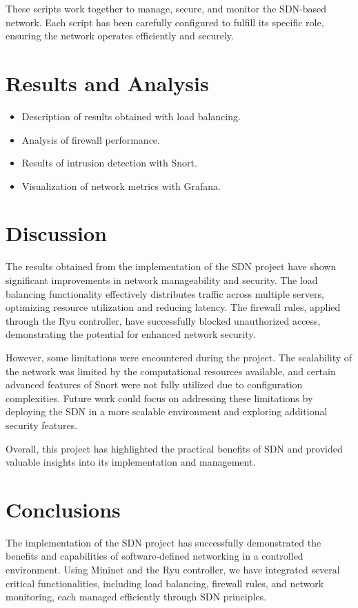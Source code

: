 \documentclass[a4paper,12pt]{article}
\begin{document}
These scripts work together to manage, secure, and monitor the SDN-based network. Each script has been carefully configured to fulfill its specific role, ensuring the network operates efficiently and securely.


\section{Results and Analysis}
\begin{itemize}
    \item Description of results obtained with load balancing.
    \item Analysis of firewall performance.
    \item Results of intrusion detection with Snort.
    \item Visualization of network metrics with Grafana.
\end{itemize}

\section{Discussion}
The results obtained from the implementation of the SDN project have shown significant improvements in network manageability and security. The load balancing functionality effectively distributes traffic across multiple servers, optimizing resource utilization and reducing latency. The firewall rules, applied through the Ryu controller, have successfully blocked unauthorized access, demonstrating the potential for enhanced network security.

However, some limitations were encountered during the project. The scalability of the network was limited by the computational resources available, and certain advanced features of Snort were not fully utilized due to configuration complexities. Future work could focus on addressing these limitations by deploying the SDN in a more scalable environment and exploring additional security features.

Overall, this project has highlighted the practical benefits of SDN and provided valuable insights into its implementation and management.

\section{Conclusions}

The implementation of the SDN project has successfully demonstrated the benefits and capabilities of software-defined networking in a controlled environment. Using Mininet and the Ryu controller, we have integrated several critical functionalities, including load balancing, firewall rules, and network monitoring, each managed efficiently through SDN principles.
\end{document}
